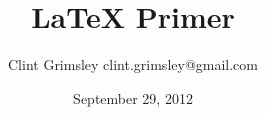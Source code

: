\documentclass{beamer}
\title{LaTeX Primer}
\author{Clint Grimsley clint.grimsley@gmail.com}
\date{September 29, 2012}
\begin{document}
\begin{frame}
\titlepage
\end{frame}
\end{document}
